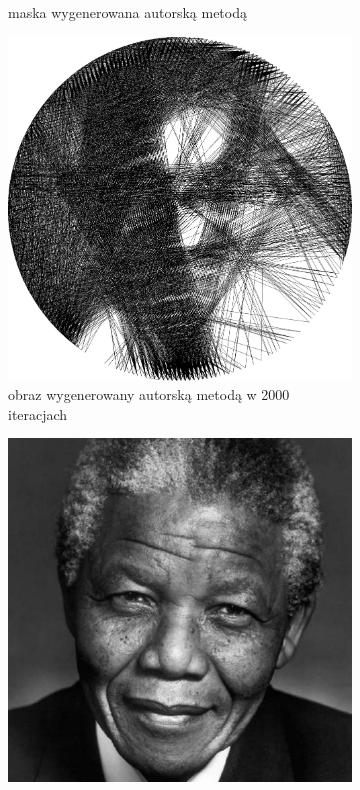 \begin{figure}[H]
\begin{subfigure}{0.24\textwidth}
        \caption{maska wygenerowana autorską metodą}
        \label{comp-comp-gandhi-mandela-c}
    \end{subfigure}
    \begin{subfigure}{0.24\textwidth}
        \centering
        \includegraphics[width = \textwidth]{img/6-comp/gandhi_e_i2000_c20_inv0_bg10_obj1_ed10.png}
        \caption{obraz wygenerowany autorską metodą w 2000 iteracjach}
        \label{comp-comp-gandhi-mandela-d}
    \end{subfigure}
    \begin{subfigure}{0.24\textwidth}
        \centering
        \includegraphics[width = \textwidth]{img/6-comp/mandela_original_c10_inv0.png}

\end{subfigure}
\end{figure}
